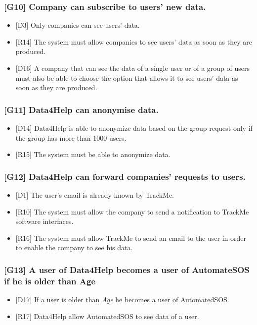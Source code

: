 \documentclass{article}
\begin{document}
\subsubsection{[G10] Company can subscribe to users’ new data.}
\begin{itemize}
\item {[D3]} Only companies can see users’ data.
\item {[R14]} The system must allow companies to see users' data as soon as they are produced.
\item {[D16]} A company that can see the data of a single user or of a group of users must also be able to choose the option that allows it to see users' data as soon as they are produced.
\end{itemize}
\subsubsection{[G11] Data4Help can anonymise data.}
\begin{itemize}
\item {[D14]} Data4Help is able to anonymize data based on the group request only if the group has more than 1000 users.
\item {[R15]} The system must be able to anonymize data.
\end{itemize}
\subsubsection{[G12] Data4Help can forward companies’ requests to users.}
\begin{itemize}
\item {[D1]} The user’s email is already known by TrackMe.
\item {[R10]} The system must allow the company to send a notification to TrackMe software interfaces.
\item {[R16]} The system must allow TrackMe to send an email to the user in order to enable the company to see his data.
\end{itemize}
\subsubsection{[G13] A user of Data4Help becomes a user of AutomateSOS if he is older than Age}
\begin{itemize}
\item {[D17]} If a user is older than \emph{Age} he becomes a user of AutomatedSOS. 
\item {[R17]} Data4Help allow AutomatedSOS to see data of a user.
\end{itemize}\newpage
\end{document}
